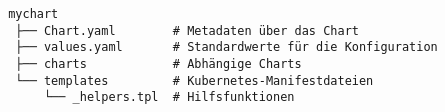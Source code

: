 
\begin{verbatim}
 mychart
  ├── Chart.yaml        # Metadaten über das Chart
  ├── values.yaml       # Standardwerte für die Konfiguration
  ├── charts            # Abhängige Charts
  └── templates         # Kubernetes-Manifestdateien
      └── _helpers.tpl  # Hilfsfunktionen
\end{verbatim}